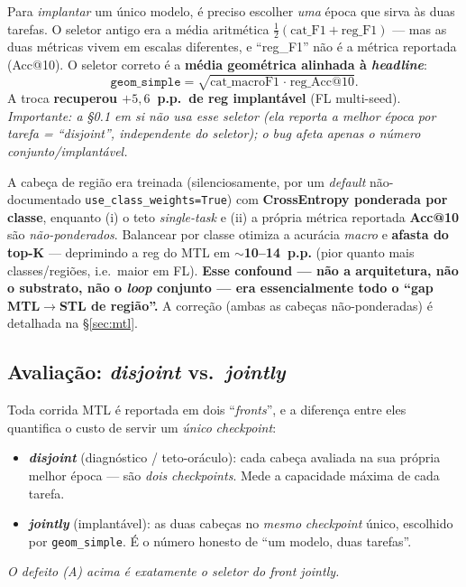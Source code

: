 \documentclass[11pt,a4paper]{article}
\newcommand{\bad}[1]{\textcolor{red!60!black}{\textbf{#1}}}
\newcommand{\note}[1]{\textcolor{black!55}{\textit{#1}}}
\begin{document}
\begin{description}[leftmargin=1.2em,style=nextline]

\item[\textbf{(A) A fórmula do \textit{joint} estava errada} (seletor de \textit{checkpoint}, C21).]
Para \emph{implantar} um único modelo, é preciso escolher \emph{uma} época que sirva às duas tarefas.
O seletor antigo era a média aritmética $\tfrac{1}{2}(\text{cat\_F1}+\text{reg\_F1})$ --- mas as duas
métricas vivem em escalas diferentes, e ``reg\_F1'' não é a métrica reportada (Acc@10). O seletor
correto é a \textbf{média geométrica alinhada à \textit{headline}}:
\[
\texttt{geom\_simple} = \sqrt{\text{cat\_macroF1}\;\cdot\;\text{reg\_Acc@10}}.
\]
A troca \textbf{recuperou $+5{,}6$~p.p.\ de reg implantável} (FL multi-seed). \note{Importante: a
\S0.1 em si \emph{não} usa esse seletor (ela reporta a melhor época \emph{por tarefa} = ``disjoint'',
independente do seletor); o bug afeta apenas o número \emph{conjunto/implantável}.}

\item[\textbf{(B) O método de \textit{loss} das cabeças estava desalinhado da métrica} (C25,
descoberto 2026-06-05).] A cabeça de região era treinada (silenciosamente, por um \textit{default}
não-documentado \texttt{use\_class\_weights=True}) com \textbf{CrossEntropy ponderada por classe},
enquanto (i) o teto \textit{single-task} e (ii) a própria métrica reportada \textbf{Acc@10} são
\emph{não-ponderados}. Balancear por classe otimiza a acurácia \emph{macro} e \textbf{afasta do
top-K} --- deprimindo a reg do MTL em \bad{$\sim$10--14~p.p.} (pior quanto mais classes/regiões,
i.e.\ maior em FL). \textbf{Esse confound --- não a arquitetura, não o substrato, não o
\textit{loop} conjunto --- era essencialmente todo o ``gap MTL$\to$STL de região''.} A correção
(ambas as cabeças não-ponderadas) é detalhada na \S\ref{sec:mtl}.

\end{description}

\subsection{Avaliação: \textit{disjoint} vs.\ \textit{jointly}}\label{sec:disjoint}

Toda corrida MTL é reportada em dois ``\textit{fronts}'', e a diferença entre eles quantifica o custo
de servir um \emph{único} \textit{checkpoint}:
\begin{itemize}[leftmargin=*,noitemsep]
\item \textbf{\textit{disjoint}} (diagnóstico / teto-oráculo): cada cabeça avaliada na sua própria
melhor época --- são \emph{dois} \textit{checkpoints}. Mede a capacidade máxima de cada tarefa.
\item \textbf{\textit{jointly}} (implantável): as duas cabeças no \emph{mesmo} \textit{checkpoint}
único, escolhido por \texttt{geom\_simple}. É o número honesto de ``um modelo, duas tarefas''.
\end{itemize}
\note{O defeito (A) acima é exatamente o seletor do \textit{front} \textit{jointly}.}
\end{document}
